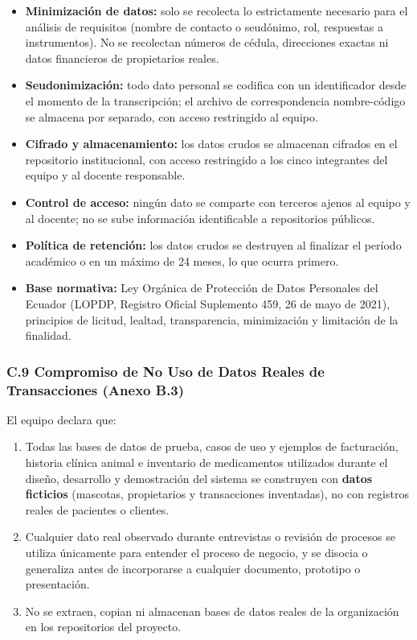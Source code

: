 \documentclass[
]{article}
\begin{document}
\begin{itemize}
  \item \textbf{Minimización de datos:} solo se recolecta lo estrictamente necesario para el análisis de requisitos (nombre de contacto o seudónimo, rol, respuestas a instrumentos). No se recolectan números de cédula, direcciones exactas ni datos financieros de propietarios reales.
  \item \textbf{Seudonimización:} todo dato personal se codifica con un identificador desde el momento de la transcripción; el archivo de correspondencia nombre-código se almacena por separado, con acceso restringido al equipo.
  \item \textbf{Cifrado y almacenamiento:} los datos crudos se almacenan cifrados en el repositorio institucional, con acceso restringido a los cinco integrantes del equipo y al docente responsable.
  \item \textbf{Control de acceso:} ningún dato se comparte con terceros ajenos al equipo y al docente; no se sube información identificable a repositorios públicos.
  \item \textbf{Política de retención:} los datos crudos se destruyen al finalizar el período académico o en un máximo de 24 meses, lo que ocurra primero.
  \item \textbf{Base normativa:} Ley Orgánica de Protección de Datos Personales del Ecuador (LOPDP, Registro Oficial Suplemento 459, 26 de mayo de 2021), principios de licitud, lealtad, transparencia, minimización y limitación de la finalidad.
\end{itemize}

\subsubsection{C.9 Compromiso de No Uso de Datos Reales de Transacciones (Anexo B.3)}\label{c9-no-uso-datos-reales}

El equipo declara que:

\begin{enumerate}
  \item Todas las bases de datos de prueba, casos de uso y ejemplos de facturación, historia clínica animal e inventario de medicamentos utilizados durante el diseño, desarrollo y demostración del sistema se construyen con \textbf{datos ficticios} (mascotas, propietarios y transacciones inventadas), no con registros reales de pacientes o clientes.
  \item Cualquier dato real observado durante entrevistas o revisión de procesos se utiliza únicamente para entender el proceso de negocio, y se disocia o generaliza antes de incorporarse a cualquier documento, prototipo o presentación.
  \item No se extraen, copian ni almacenan bases de datos reales de la organización en los repositorios del proyecto.
\end{enumerate}
\end{document}
